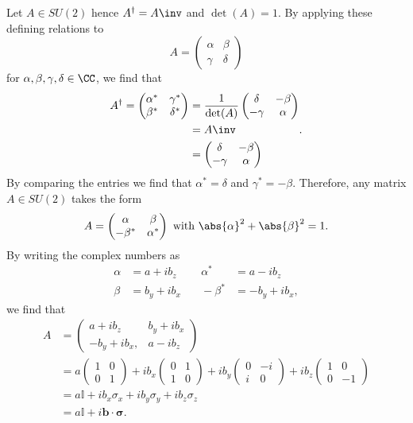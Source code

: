 \documentclass[12pt, a4paper]{article}
\begin{document}
Let \(A \in SU(2)\) hence \(A^{\dagger}=A\inv\) and \(\det(A)=1\). By applying these defining relations to
\[A=\begin{pmatrix}
   \alpha  & \beta \\ \gamma & \delta
\end{pmatrix}\]
for \(\alpha, \beta, \gamma, \delta \in \CC\), we find that 
\[\begin{aligned}
    A^{\dagger}=\begin{pmatrix}
        \alpha^*  & \gamma^*  \\ \beta^*  & \delta^*
    \end{pmatrix} &= \frac{1}{\det(A)} \begin{pmatrix}
        \delta & -\beta \\ -\gamma & \alpha
    \end{pmatrix} \\
    &= A\inv \\
    &=\begin{pmatrix}
        \delta & -\beta \\ -\gamma & \alpha
    \end{pmatrix}
\end{aligned}.\]
By comparing the entries we find that \(\alpha^*=\delta\) and \(\gamma^*=-\beta\). Therefore, any matrix \(A \in SU(2)\) takes the form
\[A=\begin{pmatrix}
    \alpha & \beta \\ -\beta^* & \alpha^*
\end{pmatrix} \text{ with } \abs{\alpha}^2+\abs{\beta}^2=1.\]
By writing the complex numbers as
\[\begin{aligned}
    \alpha &= a+ib_z &\quad \alpha^*&=a-ib_z \\
    \beta&=b_y+ib_x &\quad -\beta^*&=-b_y+ib_x,
\end{aligned}\]
we find that
\[\begin{aligned}
    A &=\begin{pmatrix}
        a+ib_z & b_y+ib_x \\
        -b_y+ib_x, & a-ib_z
    \end{pmatrix} \\
    &=a\begin{pmatrix} 1 & 0 \\ 0 & 1\end{pmatrix} +ib_x \begin{pmatrix} 0 & 1 \\ 1 &0 \end{pmatrix}+ib_y \begin{pmatrix} 0 & -i \\i & 0 \end{pmatrix}+ ib_z\begin{pmatrix} 1 & 0 \\ 0 & -1 \end{pmatrix}\\
        &= a\mathbb{I}+ib_x \sigma_x +ib_y \sigma_y +ib_z \sigma_z \\
        &= a \mathbb{I}+ i \bm{b}\cdot \bm{\sigma}.
\end{aligned}\]
\end{document}
